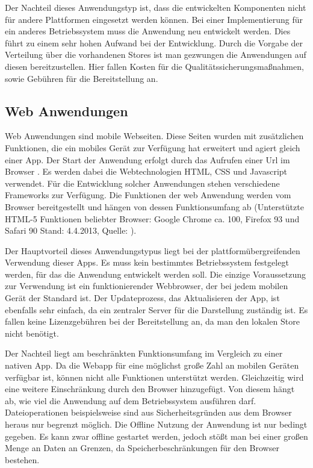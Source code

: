  Der Nachteil dieses Anwendungstyp ist, dass die entwickelten Komponenten nicht für andere Plattformen eingesetzt werden können. Bei einer Implementierung für ein anderes Betriebssystem muss die Anwendung neu entwickelt werden. Dies führt zu einem sehr hohen Aufwand bei der Entwicklung. Durch die Vorgabe der Verteilung über die vorhandenen Stores ist man gezwungen die Anwendungen auf diesen bereitzustellen. Hier fallen Kosten für die Qualitätssicherungsmaßnahmen, sowie Gebühren für die Bereitstellung an.

\subsection{Web Anwendungen}
Web Anwendungen sind mobile Webseiten. Diese Seiten wurden mit zusätzlichen Funktionen, die ein mobiles Gerät zur Verfügung hat erweitert und agiert gleich einer App. Der Start der Anwendung erfolgt durch das Aufrufen einer Url im Browser . Es werden dabei die Webtechnologien HTML, CSS und Javascript verwendet. Für die Entwicklung solcher Anwendungen stehen verschiedene Frameworks zur Verfügung. Die Funktionen der web Anwendung werden vom Browser bereitgestellt und hängen von dessen Funktionsumfang ab (Unterstützte HTML-5 Funktionen beliebter Browser: Google Chrome ca. 100, Firefox 93 und Safari 90 Stand: 4.4.2013, Quelle: \cite{bib:webapp}).   \par

Der Hauptvorteil dieses Anwendungstypus liegt bei der plattformübergreifenden Verwendung dieser Apps. Es muss kein bestimmtes Betriebssystem festgelegt werden, für das die Anwendung entwickelt werden soll. Die einzige Voraussetzung zur Verwendung ist ein funktionierender Webbrowser, der bei jedem mobilen Gerät der Standard ist. Der Updateprozess, das Aktualisieren der App, ist ebenfalls sehr einfach, da ein zentraler Server für die Darstellung zuständig ist. Es fallen keine Lizenzgebühren bei der Bereitstellung an, da man den lokalen Store nicht benötigt. 

Der Nachteil liegt am beschränkten Funktionsumfang im Vergleich zu einer nativen App. Da die Webapp für eine möglichst große Zahl an mobilen Geräten verfügbar ist, können nicht alle Funktionen unterstützt werden. Gleichzeitig wird eine weitere Einschränkung durch den Browser hinzugefügt. Von diesem hängt ab, wie viel die Anwendung auf dem Betriebssystem ausführen darf. Dateioperationen beispielsweise sind aus Sicherheitsgründen aus dem Browser heraus nur begrenzt möglich. Die Offline Nutzung der Anwendung ist nur bedingt gegeben. Es kann zwar offline gestartet werden, jedoch stößt man bei einer großen Menge an Daten an Grenzen, da Speicherbeschränkungen für den Browser bestehen.

